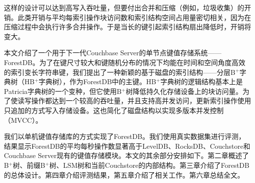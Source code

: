 这样的设计可以达到高写入吞吐量，但要付出合并和压缩（例如，垃圾收集）的开销。此类开销与平均每索引操作块访问数和索引结构空间占用量密切相关，因为在压缩过程中会执行许多合并操作。于是当长的键引起索引结构扇出降低时，开销将变大。

本文介绍了一个用于下一代Couchbase Server的单节点键值存储系统——ForestDB。为了在键尺寸较大和键随机分布的情况下均能在时间和空间角度高效的索引变长字符串键，我们提出了一种新颖的基于磁盘的索引结构——分层B$^+$字典树（HB$^+$字典树），作为ForestDB中的主键。HB$^+$字典树的逻辑结构基本上是Patricia字典树的一个变种，但它使用B$^+$树降低持久化存储设备上的块访问量。为了使读写操作都达到一个较高的吞吐量，并且支持高并发访问，更新索引操作使用只追加的方式写入存储设备。这也简化了磁盘结构以实现多版本并发控制（MVCC）。

我们以单机键值存储库的方式实现了ForestDB。我们使用真实数据集进行评测，结果显示ForestDB的平均每秒操作数显著高于LevelDB、RocksDB、Couchstore和Couchbase Server现有的键值存储模块。本文的其余部分安排如下。第二章概述了B$^+$树、前缀B$^+$树、LSM树和当前Couchstore的内部结构。第三章介绍了ForestDB的总体设计。第四章介绍评测结果，第五章介绍了相关工作。第六章总结全文。
